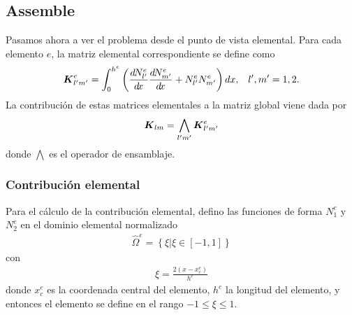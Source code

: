 \documentclass[a4paper,11pt,oneside]{article}
\begin{document}
\subsection*{Assemble}
Pasamos ahora a ver el problema desde el punto de vista elemental. Para cada elemento
$e$, la matriz elemental correspondiente se define como
\begin{align*}
  \boldsymbol{K}^e_{l'm'}&=\int_0^{h^e} \left(\frac{d^{}\!N^e_{l'}}{d\!x^{}}{}\frac{d^{}\!N^e_{m'}}{d\!x^{}}+N^e_{l'}N^e_{m'}\right)dx, &l',m'=1,2.
\end{align*}
La contribución de estas matrices elementales a la matriz global viene dada por
\begin{align*}
  \boldsymbol{K}_{lm} = \bigwedge_{l'm'}\boldsymbol{K}^e_{l'm'}
\end{align*}
donde $\bigwedge$ es el operador de ensamblaje.
%
\subsubsection*{Contribución elemental}
Para el cálculo de la contribución elemental, defino las funciones de forma
$N^e_1$ y $N^e_2$ en el dominio elemental normalizado
\begin{align*}
  \hat\Omega^e=\left\{\xi|\xi\in[-1,1]\right\}
\end{align*}
con
\begin{align*}
  \xi=\frac{2(x-x_c^e)}{h^e}
\end{align*}
donde $x_c^e$ es la coordenada central del elemento, $h^e$ la longitud del elemento, y entonces
el elemento se define en el rango $-1\leq\xi\leq 1$.
\end{document}
